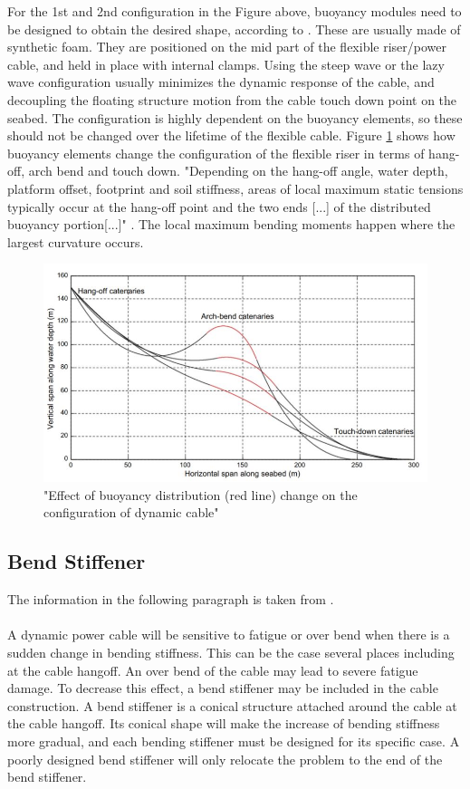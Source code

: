 \noindent For the 1st and 2nd configuration in the Figure above, buoyancy modules need to be designed to obtain the desired shape, according to \cite{srinil2016}. These are usually made of synthetic foam. They are positioned on the mid part of the flexible riser/power cable, and held in place with internal clamps. Using the steep wave or the lazy wave configuration usually minimizes the dynamic response of the cable, and decoupling the floating structure motion from the cable touch down point on the seabed. The configuration is highly dependent on the buoyancy elements, so these should not be changed over the lifetime of the flexible cable. Figure \ref{fig:bend} shows how buoyancy elements change the configuration of the flexible riser in terms of hang-off, arch bend and touch down. "Depending on the hang-off angle, water depth, platform offset, footprint and soil stiffness, areas of local maximum static tensions typically occur at the hang-off point and
the two ends [...] of the distributed buoyancy portion[...]" \cite{srinil2016}. The local maximum bending moments happen where the largest curvature occurs.

\begin{figure}[H]
\centering
\includegraphics[scale=0.6]{figures/bend}
\caption[$\; \:$Effect of buoyancy distribution]{"Effect of buoyancy distribution (red line) change on the configuration of dynamic
cable" \cite{srinil2016}}
 \label{fig:bend}
\end{figure}
\subsection{Bend Stiffener}
The information in the following paragraph is taken from \cite{Worzyk}.\\\\
A dynamic power cable will be sensitive to fatigue or over bend when there is a sudden change in bending stiffness. This can be the case several places including at the cable hangoff. An over bend of the cable may lead to severe fatigue damage. To decrease this effect, a bend stiffener may be included in the cable construction. A bend stiffener is a conical structure attached around the cable at the cable hangoff. Its conical shape will make the increase of bending stiffness more gradual, and each bending stiffener must be designed for its specific case. A poorly designed bend stiffener will only relocate the problem to the end of the bend stiffener.


